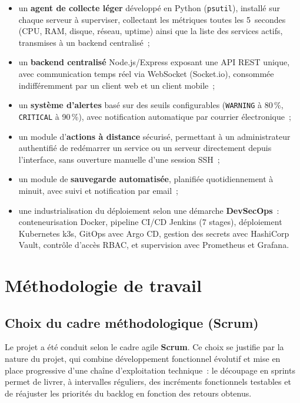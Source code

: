 \begin{itemize}
  \item un \textbf{agent de collecte léger} développé en Python (\texttt{psutil}), installé sur chaque serveur à superviser, collectant les métriques toutes les 5~secondes (CPU, RAM, disque, réseau, uptime) ainsi que la liste des services actifs, transmises à un backend centralisé~;
  \item un \textbf{backend centralisé} Node.js/Express exposant une API REST unique, avec communication temps réel via WebSocket (Socket.io), consommée indifféremment par un client web et un client mobile~;
  \item un \textbf{système d'alertes} basé sur des seuils configurables (\texttt{WARNING} à 80\,\%, \texttt{CRITICAL} à 90\,\%), avec notification automatique par courrier électronique~;
  \item un module d'\textbf{actions à distance} sécurisé, permettant à un administrateur authentifié de redémarrer un service ou un serveur directement depuis l'interface, sans ouverture manuelle d'une session SSH~;
  \item un module de \textbf{sauvegarde automatisée}, planifiée quotidiennement à minuit, avec suivi et notification par email~;
  \item une industrialisation du déploiement selon une démarche \textbf{DevSecOps}~: conteneurisation Docker, pipeline CI/CD Jenkins (7 stages), déploiement Kubernetes k3s, GitOps avec Argo CD, gestion des secrets avec HashiCorp Vault, contrôle d'accès RBAC, et supervision avec Prometheus et Grafana.
\end{itemize}

\section{Méthodologie de travail}

\subsection{Choix du cadre méthodologique (Scrum)}

Le projet a été conduit selon le cadre agile \textbf{Scrum}. Ce choix se justifie par la nature du projet, qui combine développement fonctionnel évolutif et mise en place progressive d'une chaîne d'exploitation technique~: le découpage en sprints permet de livrer, à intervalles réguliers, des incréments fonctionnels testables et de réajuster les priorités du backlog en fonction des retours obtenus.

